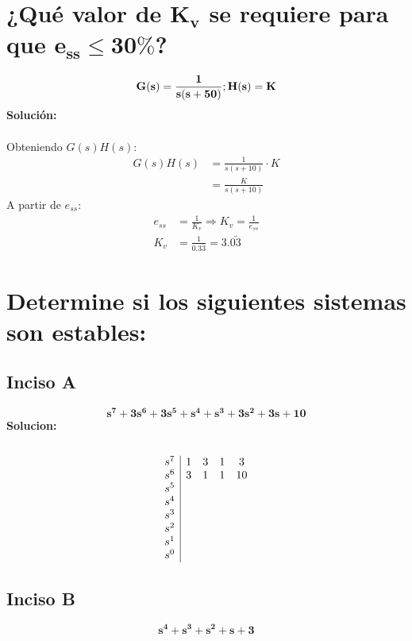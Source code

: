 \documentclass[11pt, twoside]{article}
\begin{document}
\section{¿Qué valor de $\mathbf{K_{v}}$ se requiere para que $\mathbf{e_{ss}\le 30\%}$?}
\begin{equation*}
    \mathbf{G(s) = \frac{1}{s(s+50)}; \space H(s)=K}
\end{equation*}
\textbf{Solución:}\\\\
Obteniendo $G(s)H(s)$:
\begin{align*}
    G(s)H(s) &= \frac{1}{s(s+10)}\cdot K\\
    &= \boxed{\frac{K}{s(s+10)}}
\end{align*}
A partir de $e_{ss}$:
\begin{align*}
    e_{ss} &= \frac{1}{K_{v}} \Rightarrow K_{v} = \frac{1}{e_{ss}}\\
    K_{v} &= \frac{1}{0.3\bar{3}} = 3.\bar{03}
\end{align*}
\section{Determine si los siguientes sistemas son estables:}
\subsection{Inciso A}
\begin{equation*}
    \mathbf{s^{7} + 3s^{6} + 3s^{5} + s^{4} + s^{3} + 3s^{2} + 3s + 10}
\end{equation*}
\textbf{Solucion:}\\\\
\begin{equation*}
    \begin{array}{c|c c c c }
        s^{7} & 1 & 3 & 1 & 3\\
        s^{6} & 3 & 1 & 1 & 10\\
        s^{5} & \\
        s^{4} & \\
        s^{3} & \\
        s^{2} & \\
        s^{1} & \\
        s^{0} & \\
    \end{array}
\end{equation*}
\subsection{Inciso B}
\begin{equation*}
    \mathbf{s^{4} + s^{3} + s^{2} + s + 3}
\end{equation*}
\end{document}
